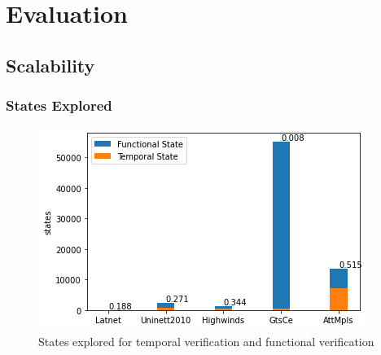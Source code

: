 \documentclass[10pt,sigconf,letterpaper,anonymous,nonacm]{acmart}
\begin{document}



\section{Evaluation}
\subsection{Scalability}

\subsubsection{States Explored}
\begin{figure}[h]
    \centering
    \includegraphics[scale=0.5]{states}
    \caption{States explored for temporal verification and functional verification}
    \label{fig:states}
\end{figure}
\end{document}
